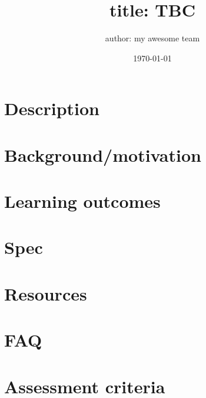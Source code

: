 \documentclass[a4paper,fontsize=12pt]{scrartcl}
\author{author: my awesome team}
\date{\today}
\title{title: TBC}
\begin{document}

\section{Description}

\vspace{0.5\textheight}

\section{Background/motivation}

\clearpage

\section{Learning outcomes}

\vspace{0.5\textheight}

\section{Spec}

\clearpage

\section{Resources}

\vspace{0.5\textheight}

\section{FAQ}

\clearpage

\section{Assessment criteria}
\end{document}
